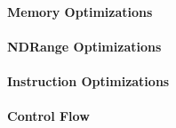 \paragraph{Memory Optimizations}

\paragraph{NDRange Optimizations}

\paragraph{Instruction Optimizations}

\paragraph{Control Flow}